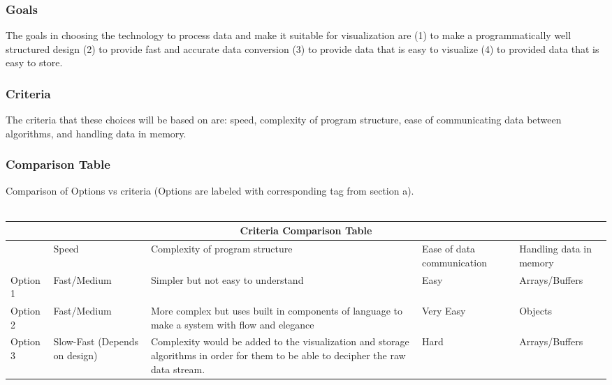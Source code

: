 \documentclass[10pt,draftclsnofoot,onecolumn]{IEEEtran}
\begin{document}
\subsubsection{Goals}
The goals in choosing the technology to process data and make it suitable for visualization are (1) to make a programmatically well structured design (2) to provide fast and accurate data conversion (3) to provide data that is easy to visualize (4) to provided data that is easy to store.\\
\subsubsection{Criteria}
The criteria that these choices will be based on are: speed, complexity of program structure, ease of communicating data between algorithms, and handling data in memory.\\
\subsubsection{Comparison Table}
Comparison of Options vs criteria (Options are labeled with corresponding tag from section a). \\ \\

\begin{tabular}{ |p{2cm}|p{2cm}|p{2cm}| p{2cm}|p{2cm}|  }
\hline
\multicolumn{5}{|c|}{Criteria Comparison Table} \\
\hline
   &Speed&Complexity of program structure&Ease of data communication&Handling data in memory\\
\hline
Option 1&Fast/Medium&Simpler but not easy to understand&Easy&Arrays/Buffers\\
\hline
Option 2&Fast/Medium&More complex but uses built in components of language to make a system with flow and elegance&Very Easy&Objects\\
\hline
Option 3&Slow-Fast (Depends on design) &Complexity would be added to the visualization and storage algorithms in order for them to be able to decipher the raw data stream.&Hard&Arrays/Buffers \\
\hline
\end{tabular}
\vspace{1cm}
\end{document}
